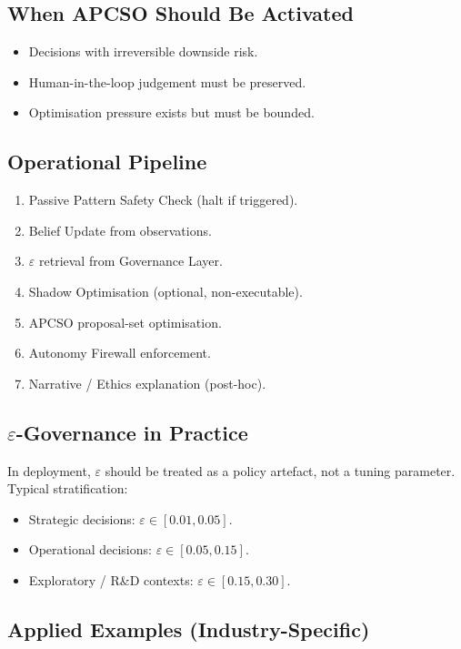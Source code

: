 \subsection{When APCSO Should Be Activated}

\begin{itemize}
\item Decisions with irreversible downside risk.
\item Human-in-the-loop judgement must be preserved.
\item Optimisation pressure exists but must be bounded.
\end{itemize}

\subsection{Operational Pipeline}

\begin{enumerate}
\item Passive Pattern Safety Check (halt if triggered).
\item Belief Update from observations.
\item $\varepsilon$ retrieval from Governance Layer.
\item Shadow Optimisation (optional, non-executable).
\item APCSO proposal-set optimisation.
\item Autonomy Firewall enforcement.
\item Narrative / Ethics explanation (post-hoc).
\end{enumerate}

\subsection{$\varepsilon$-Governance in Practice}

In deployment, $\varepsilon$ should be treated as a policy artefact,
not a tuning parameter. Typical stratification:

\begin{itemize}
\item Strategic decisions: $\varepsilon \in [0.01, 0.05]$.
\item Operational decisions: $\varepsilon \in [0.05, 0.15]$.
\item Exploratory / R\&D contexts: $\varepsilon \in [0.15, 0.30]$.
\end{itemize}

\subsection{Applied Examples (Industry-Specific)}

